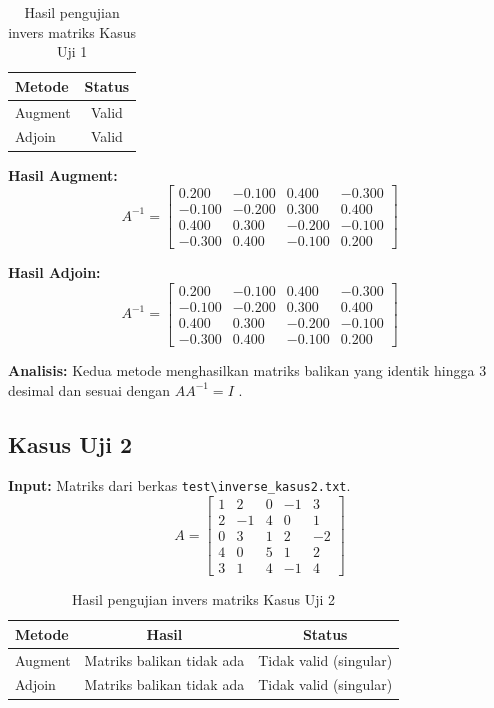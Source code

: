 \documentclass[12pt,a4paper]{report}
\begin{document}
\begin{table}[H]
    \centering
    \caption{Hasil pengujian invers matriks Kasus Uji 1}
    \begin{tabular}{|l|c|}
        \hline
        \textbf{Metode} & \textbf{Status} \\
        \hline
        Augment & Valid \\
        Adjoin  & Valid \\
        \hline
    \end{tabular}
\end{table}
 
\textbf{Hasil Augment:}
\[
A^{-1} = \begin{bmatrix}
     0.200 & -0.100 &  0.400 & -0.300 \\
    -0.100 & -0.200 &  0.300 &  0.400 \\
     0.400 &  0.300 & -0.200 & -0.100 \\
    -0.300 &  0.400 & -0.100 &  0.200
\end{bmatrix}
\]
 
\textbf{Hasil Adjoin:}
\[
A^{-1} = \begin{bmatrix}
     0.200 & -0.100 &  0.400 & -0.300 \\
    -0.100 & -0.200 &  0.300 &  0.400 \\
     0.400 &  0.300 & -0.200 & -0.100 \\
    -0.300 &  0.400 & -0.100 &  0.200
\end{bmatrix}
\]
 
\textbf{Analisis:} Kedua metode menghasilkan matriks balikan yang identik hingga 3 desimal dan sesuai dengan $AA^{-1}=I$ . 

\subsection{Kasus Uji 2}
\textbf{Input:} Matriks dari berkas \texttt{test\textbackslash inverse\_kasus2.txt}.
\[
A = \begin{bmatrix}
    1 &2 &0 &-1 &3 \\
    2 &-1 &4 &0 &1 \\ 
    0 &3 &1 &2 &-2 \\ 
    4 &0 &5 &1 &2 \\    
    3 &1 &4 &-1 &4
\end{bmatrix}
\]
 
\begin{table}[H]
    \centering
    \caption{Hasil pengujian invers matriks Kasus Uji 2}
    \begin{tabular}{|l|c|c|}
        \hline
        \textbf{Metode} & \textbf{Hasil} & \textbf{Status} \\
        \hline
        Augment & Matriks balikan tidak ada & Tidak valid (singular) \\
        Adjoin  & Matriks balikan tidak ada & Tidak valid (singular) \\
        \hline
    \end{tabular}
\end{table}
 
\end{document}
